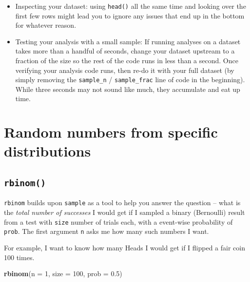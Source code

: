 \documentclass[]{book}
\newenvironment{Shaded}{\begin{snugshade}}{\end{snugshade}}
\newcommand{\DataTypeTok}[1]{\textcolor[rgb]{0.13,0.29,0.53}{#1}}
\newcommand{\DecValTok}[1]{\textcolor[rgb]{0.00,0.00,0.81}{#1}}
\newcommand{\FloatTok}[1]{\textcolor[rgb]{0.00,0.00,0.81}{#1}}
\newcommand{\KeywordTok}[1]{\textcolor[rgb]{0.13,0.29,0.53}{\textbf{#1}}}
\newcommand{\NormalTok}[1]{#1}
\providecommand{\tightlist}{%
  \setlength{\itemsep}{0pt}\setlength{\parskip}{0pt}}
\theoremstyle{definition}
\theoremstyle{definition}
\theoremstyle{definition}
\theoremstyle{remark}
\begin{document}
\begin{Shaded}
\begin{Highlighting}[]
\begin{Shaded}
\begin{Highlighting}[]
\begin{Shaded}
\begin{Highlighting}[]
\begin{itemize}
\tightlist
\item
  Inspecting your dataset: using \texttt{head()} all the same time and looking over the first few rows might lead you to ignore any issues that end up in the bottom for whatever reason.
\item
  Testing your analysis with a small sample: If running analyses on a dataset takes more than a handful of seconds, change your dataset upstream to a fraction of the size so the rest of the code runs in less than a second. Once verifying your analysis code runs, then re-do it with your full dataset (by simply removing the \texttt{sample\_n} / \texttt{sample\_frac} line of code in the beginning). While three seconds may not sound like much, they accumulate and eat up time.
\end{itemize}

\hypertarget{random-numbers-from-specific-distributions}{%
\section{Random numbers from specific distributions}\label{random-numbers-from-specific-distributions}}

\hypertarget{rbinom}{%
\subsection*{\texorpdfstring{\texttt{rbinom()}}{rbinom()}}\label{rbinom}}

\texttt{rbinom} builds upon \texttt{sample} as a tool to help you answer the question -- what is the \emph{total number of successes} I would get if I sampled a binary (Bernoulli) result from a test with \texttt{size} number of trials each, with a event-wise probability of \texttt{prob}. The first argument \texttt{n} asks me how many such numbers I want.

For example, I want to know how many Heads I would get if I flipped a fair coin 100 times.

\begin{Shaded}
\begin{Highlighting}[]
\KeywordTok{rbinom}\NormalTok{(}\DataTypeTok{n =} \DecValTok{1}\NormalTok{, }\DataTypeTok{size =} \DecValTok{100}\NormalTok{, }\DataTypeTok{prob =} \FloatTok{0.5}\NormalTok{)}
\end{Highlighting}
\end{Shaded}


\end{Highlighting}
\end{Shaded}
\end{Highlighting}
\end{Shaded}
\end{Highlighting}
\end{Shaded}
\end{document}
